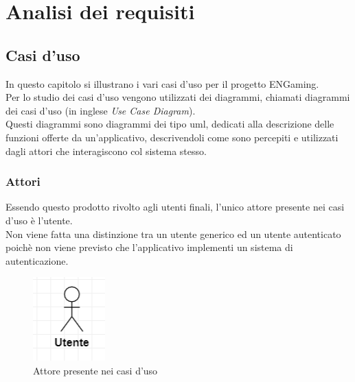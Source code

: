 

\chapter{Analisi dei requisiti}
\label{cap:analisi-requisiti}

\section{Casi d'uso}

In questo capitolo si illustrano i vari casi d'uso per il progetto ENGaming.\\
Per lo studio dei casi d'uso vengono utilizzati dei diagrammi, chiamati diagrammi dei casi d'uso (in inglese \emph{Use Case Diagram}).\\
Questi diagrammi sono diagrammi dei tipo \gls{uml}, dedicati alla descrizione delle funzioni offerte da un'applicativo, descrivendoli come sono percepiti e utilizzati dagli attori che interagiscono col sistema stesso.

\subsection{Attori}

Essendo questo prodotto rivolto agli utenti finali, l'unico attore presente nei casi d'uso è l'utente.\\
Non viene fatta una distinzione tra un utente generico ed un utente autenticato poichè non viene previsto che l'applicativo implementi un sistema di autenticazione.

\begin{figure}[h]
    \centering
    \includegraphics{images/usecase/attore.png}
    \caption{Attore presente nei casi d'uso}
    \label{fig:attore}
\end{figure}

